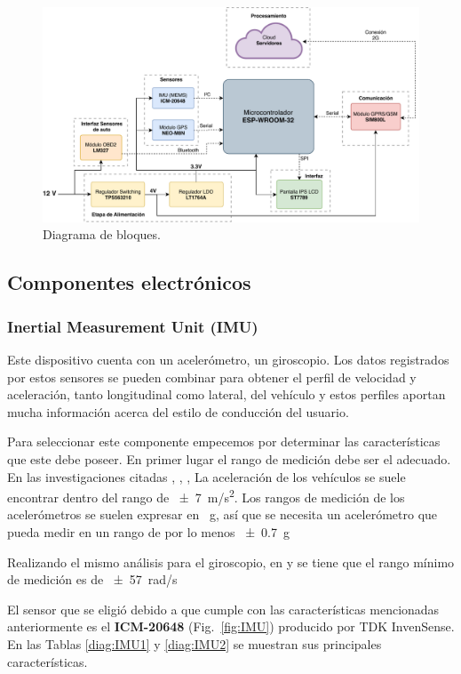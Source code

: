 \begin{figure}[htbp!]
\centering
\includegraphics[width=\textwidth]{Bloques_principal.pdf}
\caption{Diagrama de bloques.}
\label{fig:bloques}
\end{figure}

\subsection{Componentes electrónicos}


\subsubsection{Inertial Measurement Unit (IMU)}
Este dispositivo cuenta con un acelerómetro, un giroscopio. Los datos registrados por estos sensores se pueden combinar para obtener el perfil de velocidad y aceleración, tanto longitudinal como lateral, del vehículo y estos perfiles aportan mucha información acerca del estilo de conducción del usuario.

Para seleccionar este componente empecemos por determinar las características que este debe poseer. En primer lugar el rango de medición debe ser el adecuado. En las investigaciones citadas  \cite{6957822}, \cite{constantinescu}, \cite{6083078},  \cite{Va-2013} La aceleración de los vehículos se suele encontrar dentro del rango de \SI{\pm7}{m/s^2}. Los rangos de medición de los acelerómetros se suelen expresar en \SI{}{g}, así que se necesita un acelerómetro que pueda medir en un rango de por lo menos \SI{\pm0.7}{g}

Realizando el mismo análisis para el giroscopio, en \cite{6083078} y \cite{6629603} se tiene que el rango mínimo de medición es de \SI{\pm57}{rad/s}

El sensor que se eligió debido a que cumple con las características mencionadas anteriormente es el \textbf{ICM-20648} (Fig.~\ref{fig:IMU}) producido por TDK InvenSense. En las Tablas \ref{diag:IMU1} y \ref{diag:IMU2} se muestran sus principales características.

